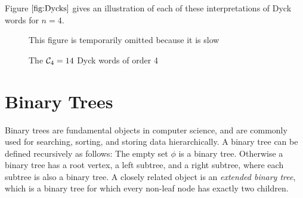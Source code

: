 Figure $\ref{fig:Dycks}$ gives an illustration of each of these interpretations of Dyck words for $n=4$.

\begin{figure}[H]
    \centering
    This figure is temporarily omitted because it is slow
    \caption{The $\mathcal{C}_4=14$ Dyck words of order 4}
    \label{fig:Dycks}
\end{figure}

\section{Binary Trees}

Binary trees are fundamental objects in computer science, and are commonly used for searching, sorting, and storing data hierarchically. A binary tree can be defined recursively as follows: The empty set $\phi$ is a binary tree. Otherwise a binary tree has a root vertex, a left subtree, and a right subtree, where each subtree is also a binary tree. A closely related object is an \emph{extended binary tree}, which is a binary tree for which every non-leaf node has exactly two children.  

